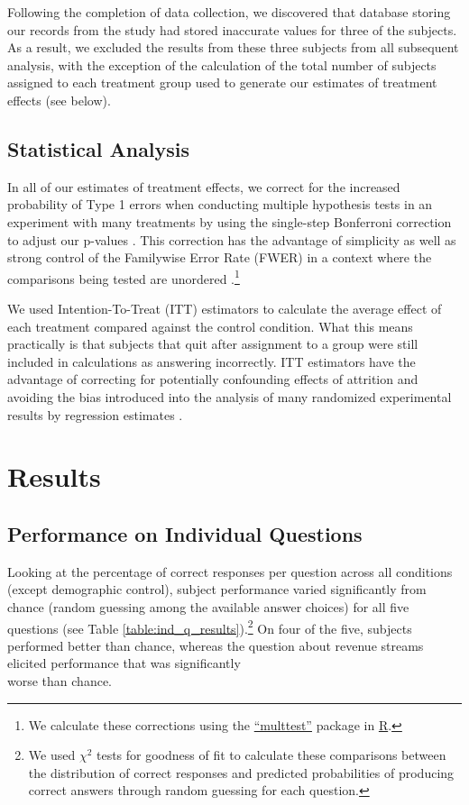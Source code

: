 \documentclass{cscw2010}
\begin{document}
Following the completion of data collection, we discovered that
database storing our records from the study had stored inaccurate
values for three of the subjects. As a result, we excluded the results
from these three subjects from all subsequent analysis, with the
exception of the calculation of the total number of subjects assigned
to each treatment group used to generate our estimates of treatment
effects (see below).

\subsection{Statistical Analysis} 

In all of our estimates of treatment effects, we correct for the
increased probability of Type 1 errors when conducting multiple
hypothesis tests in an experiment with many treatments by using the
single-step Bonferroni correction to adjust our p-values
\cite{shaffer1995, hsu1996}. This correction has the advantage of
simplicity as well as strong control of the Familywise Error Rate
(FWER) in a context where the comparisons being tested are unordered
\cite{rosenthalrubin1984}.\footnote{We calculate these corrections
  using the
  \href{http://cran.r-project.org/web/packages/multtest/index.html}{``multtest''}
  package in \href{http://www.r-project.org}{R}.}

We used Intention-To-Treat (ITT) estimators to calculate the average
effect of each treatment compared against the control condition. What
this means practically is that subjects that quit after assignment to
a group were still included in calculations as answering
incorrectly. ITT estimators have the advantage of correcting for
potentially confounding effects of attrition and avoiding the bias
introduced into the analysis of many randomized experimental results
by regression estimates \cite{freedman2008logistic,
  freedman2008multtreat}.

%

\section{Results}

\subsection{Performance on Individual Questions}
Looking at the percentage of correct responses per question across all
conditions (except demographic control), subject performance varied
significantly from chance (random guessing among the available answer
choices) for all five questions (see Table
\ref{table:ind_q_results}).\footnote{We used $\chi^{2}$ tests for
  goodness of fit to calculate these comparisons between the
  distribution of correct responses and predicted probabilities of
  producing correct answers through random guessing for each
  question.} On four of the five, subjects performed better than
chance, whereas the question about revenue streams elicited
performance that was significantly\\ worse than chance.
\end{document}
